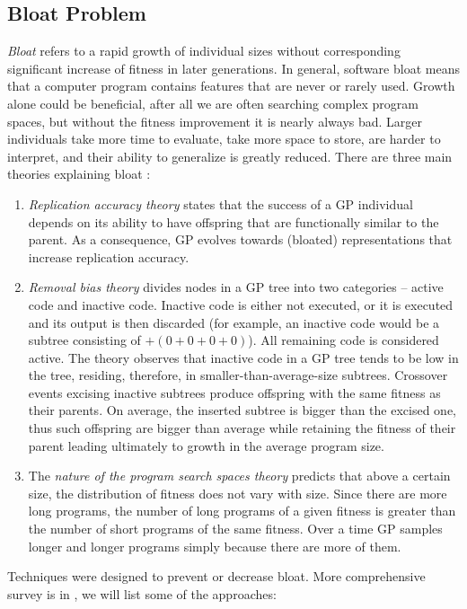  \subsection{Bloat Problem}
 \emph{Bloat} refers to a rapid growth of individual sizes without corresponding significant increase of fitness in later generations. In general, software bloat means that a computer program contains features that are never or rarely used. Growth alone could be beneficial, after all we are often searching complex program spaces, but without the fitness improvement it is nearly always bad. Larger individuals take more time to evaluate, take more space to store, are harder to interpret, and their ability to generalize is greatly reduced.
 There are three main theories explaining bloat \cite{FieldGuideToGeneticProgramming}:
 \begin{enumerate}
 	\item \emph{Replication accuracy theory} states that the success of a GP individual depends on its ability to have offspring that are functionally similar to the parent. As a consequence, GP evolves towards (bloated) representations that increase replication accuracy.
 	\item \emph{Removal bias theory} divides nodes in a GP tree into two categories – active code and inactive code. Inactive code is either not executed, or it is executed and its output is then discarded (for example, an inactive code would be a subtree consisting of $+(0+0+0+0)$). All remaining code is considered active. The theory observes that inactive code in a GP tree tends to be low in the tree, residing, therefore, in smaller-than-average-size subtrees. Crossover events excising inactive subtrees produce offspring with the same fitness as their parents. On average, the inserted subtree is bigger than the excised one, thus such offspring are bigger than average while retaining the fitness of their parent leading ultimately to growth in the average program size.
 	\item The \emph{nature of the program search spaces theory} predicts that above a certain size, the distribution of fitness does not vary with size. Since there are more long programs, the number of long programs of a given fitness is greater than the number of short programs of the same fitness. Over a time GP samples longer and longer programs simply because there are more of them.
 \end{enumerate}
 Techniques were designed to prevent or decrease bloat. More comprehensive survey is in \cite{LukeAntiBloatSurvey}, we will list some of the approaches:
